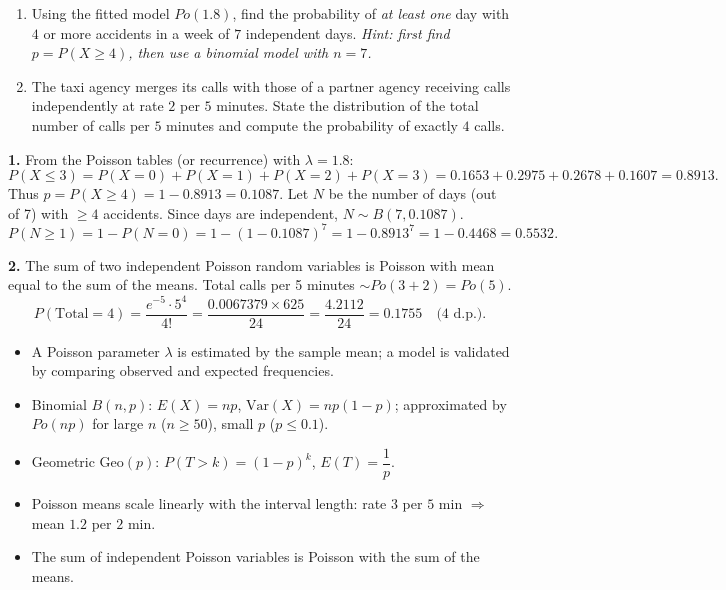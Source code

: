 \documentclass[11pt]{article}
\newcounter{popsec}
\newcounter{popsub}
\newcommand{\courssub}[1]{%
  \stepcounter{popsub}%
  \par\vspace{9pt}\noindent{\popxbold\fontsize{11.5}{13}\selectfont\color{popink}{\color{poporange}\thepopsec.\thepopsub}\hspace{6pt}#1}\par\nopagebreak\vspace{4pt}
}
\begin{document}
\courssub{Going Further}

\begin{exercice}
\begin{enumerate}
\item Using the fitted model $Po(1.8)$, find the probability of \emph{at least one} day with $4$ or more accidents in a week of $7$ independent days. \emph{Hint: first find $p = P(X \geq 4)$, then use a binomial model with $n = 7$.}
\item The taxi agency merges its calls with those of a partner agency receiving calls independently at rate $2$ per $5$ minutes. State the distribution of the total number of calls per $5$ minutes and compute the probability of exactly $4$ calls.
\end{enumerate}
\end{exercice}

\begin{corrige}
\textbf{1.} From the Poisson tables (or recurrence) with $\lambda = 1.8$:
\[
P(X \leq 3) = P(X=0)+P(X=1)+P(X=2)+P(X=3) = 0.1653 + 0.2975 + 0.2678 + 0.1607 = 0.8913.
\]
Thus $p = P(X \geq 4) = 1 - 0.8913 = 0.1087$.
Let $N$ be the number of days (out of 7) with $\geq 4$ accidents. Since days are independent, $N \sim B(7, 0.1087)$.
\[
P(N \geq 1) = 1 - P(N=0) = 1 - (1 - 0.1087)^7 = 1 - 0.8913^7 = 1 - 0.4468 = 0.5532.
\]

\textbf{2.} The sum of two independent Poisson random variables is Poisson with mean equal to the sum of the means.
Total calls per 5 minutes $\sim Po(3 + 2) = Po(5)$.
\[
P(\text{Total} = 4) = \frac{e^{-5} \cdot 5^4}{4!} = \frac{0.0067379 \times 625}{24} = \frac{4.2112}{24} = 0.1755 \quad \text{(4 d.p.)}.
\]
\end{corrige}

\begin{aretenir}
\begin{itemize}
\item A Poisson parameter $\lambda$ is estimated by the sample mean; a model is validated by comparing observed and expected frequencies.
\item Binomial $B(n,p)$: $E(X) = np$, $\mathrm{Var}(X) = np(1-p)$; approximated by $Po(np)$ for large $n$ ($n \geq 50$), small $p$ ($p \leq 0.1$).
\item Geometric $\mathrm{Geo}(p)$: $P(T > k) = (1-p)^k$, $E(T) = \dfrac{1}{p}$.
\item Poisson means scale linearly with the interval length: rate $3$ per $5$ min $\Rightarrow$ mean $1.2$ per $2$ min.
\item The sum of independent Poisson variables is Poisson with the sum of the means.
\end{itemize}
\end{aretenir}
\end{document}
